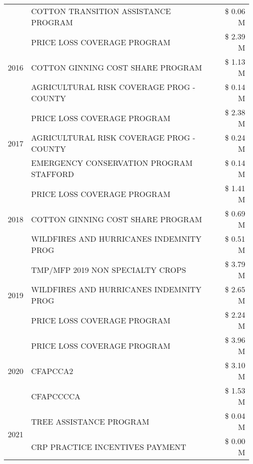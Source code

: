 \begin{tabular}{llr}
 & COTTON TRANSITION ASSISTANCE PROGRAM & \$ 0.06 M \\
\cline{1-3}
\multirow[t]{3}{*}{2016} & PRICE LOSS COVERAGE PROGRAM                   & \$ 2.39 M \\
 & COTTON GINNING COST SHARE PROGRAM             & \$ 1.13 M \\
 & AGRICULTURAL RISK COVERAGE PROG - COUNTY      & \$ 0.14 M \\
\cline{1-3}
\multirow[t]{3}{*}{2017} & PRICE LOSS COVERAGE PROGRAM & \$ 2.38 M \\
 & AGRICULTURAL RISK COVERAGE PROG - COUNTY & \$ 0.24 M \\
 & EMERGENCY CONSERVATION PROGRAM STAFFORD & \$ 0.14 M \\
\cline{1-3}
\multirow[t]{3}{*}{2018} & PRICE LOSS COVERAGE PROGRAM & \$ 1.41 M \\
 & COTTON GINNING COST SHARE PROGRAM & \$ 0.69 M \\
 & WILDFIRES AND HURRICANES INDEMNITY PROG & \$ 0.51 M \\
\cline{1-3}
\multirow[t]{3}{*}{2019} & TMP/MFP 2019 NON SPECIALTY CROPS & \$ 3.79 M \\
 & WILDFIRES AND HURRICANES INDEMNITY PROG & \$ 2.65 M \\
 & PRICE LOSS COVERAGE PROGRAM & \$ 2.24 M \\
\cline{1-3}
\multirow[t]{3}{*}{2020} & PRICE LOSS COVERAGE PROGRAM & \$ 3.96 M \\
 & CFAPCCA2 & \$ 3.10 M \\
 & CFAPCCCCA & \$ 1.53 M \\
\cline{1-3}
\multirow[t]{2}{*}{2021} & TREE ASSISTANCE PROGRAM & \$ 0.04 M \\
 & CRP PRACTICE INCENTIVES PAYMENT & \$ 0.00 M \\
\cline{1-3}
\bottomrule
\end{tabular}
